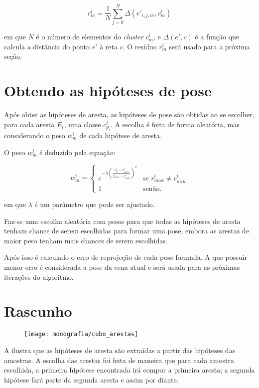 \begin{equation}
r^i_m = \frac{1}{N} \sum^{N}_{j = 0} \Delta (e'_{i,j,m}, c^i_m)
\end{equation}

em que $N$ é o número de elementos do \emph{cluster} $c^i_m$, e $\Delta (e', c)$ é a função que calcula a distância do ponto $e'$ à reta $c$. O resíduo $r^i_m$ será usado para a próxima seção.

\section{Obtendo as hipóteses de pose}

Após obter as hipóteses de aresta, as hipóteses de pose são obtidas ao se escolher, para cada aresta $E_i$, uma classe $c^i_{p_i}$. A escolha é feita de forma aleatória, mas considerando o peso $w^i_m$ de cada hipótese de aresta.

O peso $w^i_m$ é deduzido pela equação:

\begin{equation}
w^i_m = \begin{cases}
    e^{-\lambda \left( \frac{r^i_m - r^i_{min}}{r^i_{max} - r^i_{min}}\right)^2 } & \mbox{se } r^i_{max} \neq r^i_{min} \\
    1 & \mbox{senão}.
\end{cases}
\end{equation}

em que $\lambda$ é um parâmetro que pode ser ajustado.

Faz-se uma escolha aleatória com pesos para que todas as hipóteses de aresta tenham chance de serem escolhidas para formar uma pose, embora as arestas de maior peso tenham mais chances de serem escolhidas.

Após isso é calculado o erro de reprojeção de cada pose formada. A que possuir menor erro é considerada a pose da cena atual e será usada para as próximas iterações do algoritmo.

\section{Rascunho}

\begin{figure}[ht!]
\centering
\texttt{[image: monografia/cubo\_arestas]}
\caption{}
\label{cubo_arestas}
\end{figure}

A  ilustra que as hipóteses de aresta são extraídas a partir das hipóteses das amostras. A escolha das arestas foi feita de maneira que para cada amostra escolhida, a primeira hipótese encontrada irá compor a primeira aresta; a segunda hipótese fará parte da segunda aresta e assim por diante.


